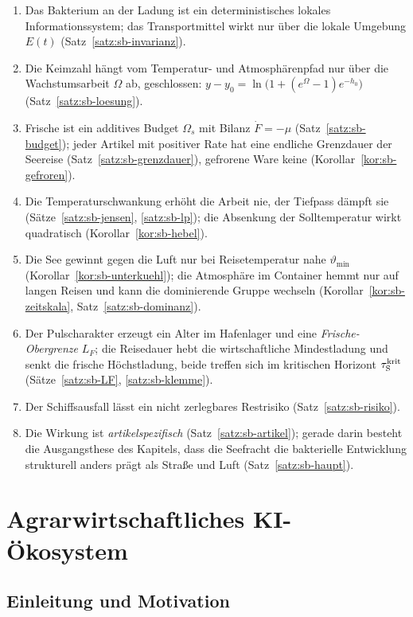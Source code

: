 \documentclass[a4paper, 12pt, twoside, openright]{report}
\theoremstyle{definition}
\theoremstyle{definition}
\begin{document}
\begin{enumerate}
  \item Das Bakterium an der Ladung ist ein deterministisches lokales Informationssystem; das
    Transportmittel wirkt nur über die lokale Umgebung $E(t)$ (Satz~\ref{satz:sb-invarianz}).
  \item Die Keimzahl hängt vom Temperatur- und Atmosphärenpfad nur über die Wachstumsarbeit
    $\Omega$ ab, geschlossen: $y-y_0=\ln\bigl(1+(e^{\Omega}-1)e^{-h_0}\bigr)$ (Satz~\ref{satz:sb-loesung}).
  \item Frische ist ein additives Budget $\Omega_s$ mit Bilanz $\dot F=-\mu$ (Satz~\ref{satz:sb-budget}); jeder
    Artikel mit positiver Rate hat eine endliche Grenzdauer der Seereise (Satz~\ref{satz:sb-grenzdauer}), gefrorene
    Ware keine (Korollar~\ref{kor:sb-gefroren}).
  \item Die Temperaturschwankung erhöht die Arbeit nie, der Tiefpass dämpft sie (Sätze~\ref{satz:sb-jensen},
    \ref{satz:sb-lp}); die Absenkung der Solltemperatur wirkt quadratisch (Korollar~\ref{kor:sb-hebel}).
  \item Die See gewinnt gegen die Luft nur bei Reisetemperatur nahe $\vartheta_{\min}$ (Korollar~\ref{kor:sb-unterkuehl});
    die Atmosphäre im Container hemmt nur auf langen Reisen und kann die dominierende Gruppe wechseln
    (Korollar~\ref{kor:sb-zeitskala}, Satz~\ref{satz:sb-dominanz}).
  \item Der Pulscharakter erzeugt ein Alter im Hafenlager und eine \emph{Frische-Obergrenze} $L_F$;
    die Reisedauer hebt die wirtschaftliche Mindestladung und senkt die frische Höchstladung, beide
    treffen sich im kritischen Horizont $\tau_{\mathrm S}^{\rm krit}$ (Sätze~\ref{satz:sb-LF}, \ref{satz:sb-klemme}).
  \item Der Schiffsausfall lässt ein nicht zerlegbares Restrisiko (Satz~\ref{satz:sb-risiko}).
  \item Die Wirkung ist \emph{artikelspezifisch} (Satz~\ref{satz:sb-artikel}); gerade darin besteht die
    Ausgangsthese des Kapitels, dass die Seefracht die bakterielle Entwicklung strukturell anders
    prägt als Straße und Luft (Satz~\ref{satz:sb-haupt}).
\end{enumerate}


\chapter{Agrarwirtschaftliches KI-Ökosystem}
\label{ch:agri-ai}

\section{Einleitung und Motivation}
\end{document}

